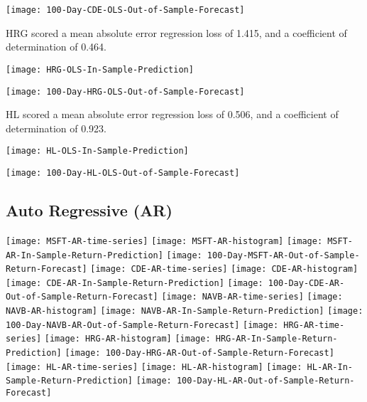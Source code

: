 \texttt{[image: 100-Day-CDE-OLS-Out-of-Sample-Forecast]}

HRG scored a mean absolute error regression loss of 1.415, and a coefficient of determination of 0.464.

\texttt{[image: HRG-OLS-In-Sample-Prediction]}

\texttt{[image: 100-Day-HRG-OLS-Out-of-Sample-Forecast]}

HL scored a mean absolute error regression loss of 0.506, and a coefficient of determination of 0.923.

\texttt{[image: HL-OLS-In-Sample-Prediction]}

\texttt{[image: 100-Day-HL-OLS-Out-of-Sample-Forecast]}

\subsection{Auto Regressive (AR)}
\texttt{[image: MSFT-AR-time-series]}
\texttt{[image: MSFT-AR-histogram]}
\texttt{[image: MSFT-AR-In-Sample-Return-Prediction]}
\texttt{[image: 100-Day-MSFT-AR-Out-of-Sample-Return-Forecast]}
\texttt{[image: CDE-AR-time-series]}
\texttt{[image: CDE-AR-histogram]}
\texttt{[image: CDE-AR-In-Sample-Return-Prediction]}
\texttt{[image: 100-Day-CDE-AR-Out-of-Sample-Return-Forecast]}
\texttt{[image: NAVB-AR-time-series]}
\texttt{[image: NAVB-AR-histogram]}
\texttt{[image: NAVB-AR-In-Sample-Return-Prediction]}
\texttt{[image: 100-Day-NAVB-AR-Out-of-Sample-Return-Forecast]}
\texttt{[image: HRG-AR-time-series]}
\texttt{[image: HRG-AR-histogram]}
\texttt{[image: HRG-AR-In-Sample-Return-Prediction]}
\texttt{[image: 100-Day-HRG-AR-Out-of-Sample-Return-Forecast]}
\texttt{[image: HL-AR-time-series]}
\texttt{[image: HL-AR-histogram]}
\texttt{[image: HL-AR-In-Sample-Return-Prediction]}
\texttt{[image: 100-Day-HL-AR-Out-of-Sample-Return-Forecast]}

